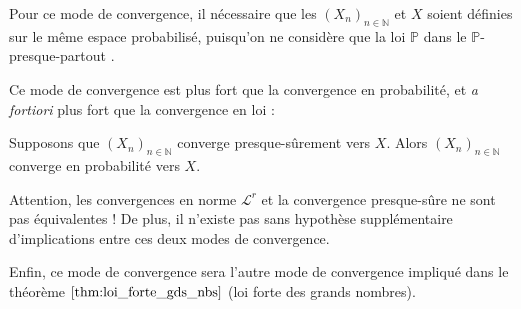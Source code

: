 \documentclass[../integ-proba.tex]{subfiles}
\begin{document}
    \begin{rem}
        Pour ce mode de convergence, il nécessaire que les $\left(X_n\right)_{n\in\mathbb{N}}$ et $X$ soient définies sur le même espace probabilisé, puisqu'on ne considère que la loi $\mathbb{P}$ dans le \og $\mathbb{P}$-presque-partout \fg.
    \end{rem}

    Ce mode de convergence est plus fort que la convergence en probabilité, et \textit{a fortiori} plus fort que la convergence en loi :

    \begin{prop}
        Supposons que $\left(X_n\right)_{n\in\mathbb{N}}$ converge presque-sûrement vers $X$.
        Alors $\left(X_n\right)_{n\in\mathbb{N}}$ converge en probabilité vers $X$.
    \end{prop}

    \begin{rem}
        Attention, les convergences en norme $\mathcal{L}^r$ et la convergence presque-sûre ne sont pas équivalentes !
        De plus, il n'existe pas sans hypothèse supplémentaire d'implications entre ces deux modes de convergence.
    \end{rem}


    \begin{rem}
        Enfin, ce mode de convergence sera l'autre mode de convergence impliqué dans le théorème $\ref{thm:loi_forte_gds_nbs}$ (loi forte des grands nombres).
    \end{rem}
\end{document}
